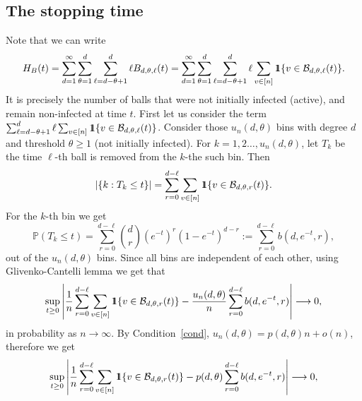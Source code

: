 \documentclass[11pt]{article}
\def\ind{{\rm 1\hspace{-0.90ex}1}}
\newcommand{\cB}{\mathcal{B}}
\begin{document}
\subsection{The stopping time}\label{sec:stop}
Note that we can write
\begin{equation*}%
    H_B(t) =  \sum_{d=1}^{\infty}\sum_{\theta=1}^{d}\sum_{\ell=d-\theta +1}^d \ell B_{d,\theta,\ell}(t)=  \sum_{d=1}^{\infty}\sum_{\theta=1}^{d}\sum_{\ell= d-\theta+1}^{d} \ell \sum_{v \in [n]} \ind\{v \in \cB_{d,\theta,\ell}(t)\}. 
\end{equation*}
It is precisely the number of balls that were not initially infected (active), and remain non-infected at time $t$. First let us consider the term $\sum_{\ell= d-\theta+1}^{d} \ell \sum_{v \in [n]} \ind\{v \in \cB_{d,\theta,\ell}(t)\}$.
Consider those $u_n(d,\theta)$ bins with degree $d$ and threshold $\theta \geq 1$ (not initially infected). For $k=1,2\ldots,u_n(d,\theta)$, let $T_k$ be the time $\ell$-th ball is removed from the $k$-the such bin. Then 
\begin{equation*}
    \left|\{k:T_k \leq t\}\right| = \sum_{r=0}^{d-\ell} \sum_{v \in [n]}\ind\{v \in \cB_{d,\theta,r}(t)\}.
\end{equation*} 
For the $k$-th bin we get
\begin{equation*}
    \mathbb{P}\left(T_k \leq t\right) = \sum_{r=0}^{d-\ell}{d \choose r} \left(e^{-t}\right)^{r}\left(1-e^{-t}\right)^{d-r} :=\sum_{r=0}^{d-\ell}b(d,e^{-t},r),
\end{equation*} 
 out of the $u_n(d,\theta)$ bins. Since all bins are independent of each other, using Glivenko-Cantelli lemma we get that
\begin{equation*}%
 \sup_{t\geq 0} \left| \frac{1}{n} \sum_{r=0}^{d-\ell}\sum_{v \in [n]} \ind\{v \in \cB_{d,\theta,r}(t)\} -\frac{u_n(d,\theta)}{n}\sum_{r=0}^{d-\ell}b(d,e^{-t},r) \right|\longrightarrow 0,
\end{equation*}
in probability as $n \rightarrow \infty$. 
By Condition~\ref{cond}, $u_n(d,\theta) = p(d,\theta)n+o(n)$, therefore we get 
\begin{equation}\label{eqn:644pm07jan21}
 \sup_{t\geq 0} \left| \frac{1}{n} \sum_{r=0}^{d-\ell}\sum_{v \in [n]}\ind\{v \in \cB_{d,\theta,r}(t)\} - p(d,\theta)\sum_{r=0}^{d-\ell}b(d,e^{-t},r) \right|\longrightarrow 0,
\end{equation}
\end{document}
